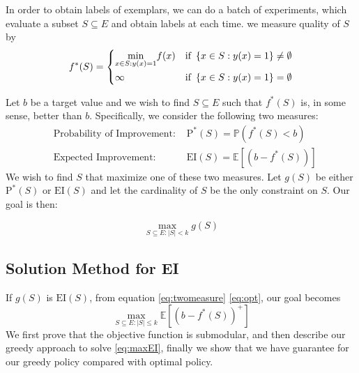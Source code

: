 \documentclass[12pt]{article}
\newcommand{\E}{\mathbb{E}}
\newcommand{\EI}{\mathrm{EI}}
\newcommand{\PI}{\text{P}^*}
\begin{document}
In order to obtain labels of exemplars, we can do a batch of experiments, which evaluate a subset $S \subseteq E$ and obtain labels at each time. we measure quality of $S$ by
\begin{equation} \label{eq:fS}
f^*(S)= \begin{dcases}
 \underset{x \in S:y(x)=1}{\min} f(x) & \text{if \,} \{x \in S:y(x)=1\} \neq \emptyset \\
 \infty  & \text{if \,} \{x \in S:y(x)=1\} = \emptyset
 \end{dcases}
\end{equation}

%
%

Let $b$ be a target value and we wish to find $S\subseteq E$ such that $f^*(S)$ is, in some sense, better than $b$. Specifically, we consider the following two measures:
\begin{equation} \label{eq:twomeasure}
\begin{align*}
&\text{Probability of Improvement: }&\PI(S) = \mathbb{P}(f^*(S) < b)\\
&\text{Expected Improvement: }&\EI(S) = \E [(b-f^*(S))]
\end{align*}
\end{equation}
We wish to find $S$ that maximize one of these two measures. Let $g(S)$ be either $\PI(S)$ or $\EI(S)$ and let the cardinality of $S$ be the only constraint on $S$. Our goal is then:

\begin{equation} \label{eq:opt}
\max_{S\subseteq E:|S|<k}g(S)
\end{equation}

\subsection{Solution Method for EI}
If $g(S)$ is $\EI(S)$, from equation \eqref{eq:twomeasure} \eqref{eq:opt}, our goal becomes
\begin{equation} \label{eq:maxEI}
\underset{S \subseteq E:|S| \leq k}{\max} \E \left[ (b-f^*(S))^+ \right]
\end{equation}
We first prove that the objective function is submodular, and then describe our greedy approach to solve \eqref{eq:maxEI}, finally we show that we have guarantee for our greedy policy compared with optimal policy.
\end{document}
